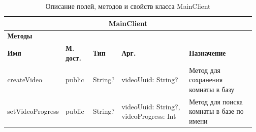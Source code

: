 \documentclass{../includes/TechDoc}
\begin{document}
    \begin{table}[h]
		\caption{\label{tab:class-MainClient-table}Описание полей, методов и свойств класса MainClient}
	    \begin{tabularx}{\textwidth}{|l|l|l|l|X|}
	    	\hline
	  		\multicolumn{5}{|c|}{MainClient} \\ \hline
			\multicolumn{5}{|l|}{\textbf{Методы}} \\ \hline
			\textbf{Имя} & \textbf{М. дост.} & \textbf{Тип} & \textbf{Арг.} & \textbf{Назначение} \\ \hline
			createVideo & public & String? & videoUuid: String? & Метод для сохранения комнаты в базу \\ \hline
			setVideoProgress & public & String? & videoUuid: String?, videoProgress: Int & Метод для поиска комнаты в базе по имени \\ \hline
		\end{tabularx}
    \end{table}

    \registrationList
\end{document}
